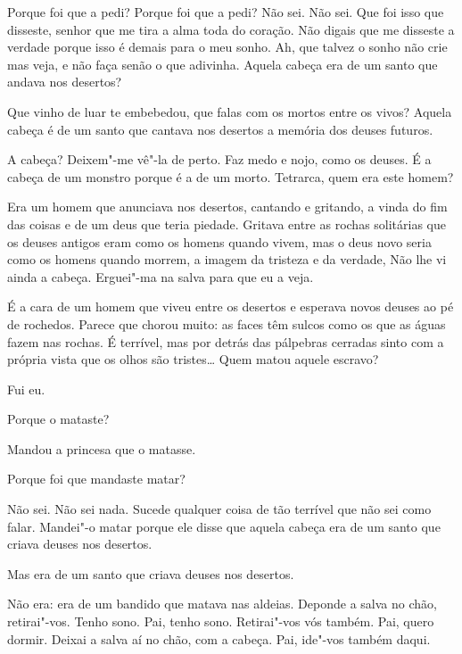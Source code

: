 Porque foi que a pedi? Porque foi que a pedi? Não sei. Não
sei. Que foi isso que disseste, senhor que me tira a alma toda do
coração. Não digais que me disseste a verdade porque isso é demais
para o meu sonho. Ah, que talvez o sonho não crie mas veja, e não
faça senão o que adivinha. Aquela cabeça era de um santo que andava
nos desertos?

 Que vinho de luar te embebedou, que falas com os mortos
entre os vivos? Aquela cabeça é de um santo que cantava nos desertos
a memória dos deuses futuros.

 A cabeça? Deixem"-me vê"-la de perto.  Faz medo e nojo, como os deuses. É a cabeça
de um monstro porque é a de um morto. Tetrarca, quem era este homem? 

 Era um homem que anunciava nos desertos, cantando e
gritando, a vinda do fim das coisas e de um deus que teria piedade.
Gritava entre as rochas solitárias que os deuses antigos eram como os
homens quando vivem, mas o deus novo seria como os homens quando
morrem, a imagem da tristeza e da verdade, Não lhe vi ainda a cabeça.
Erguei"-ma na salva para que eu a veja.


 É a cara de um homem que viveu entre os desertos e
esperava novos deuses ao pé de rochedos. Parece que chorou muito: as
faces têm sulcos como os que as águas fazem nas rochas. É terrível,
mas por detrás das pálpebras cerradas sinto com a própria vista que
os olhos são tristes\ldots{} Quem matou aquele escravo?

 Fui eu.

 Porque o mataste?

 Mandou a princesa que o matasse.

 Porque foi que mandaste matar?

 Não sei. Não sei nada. Sucede qualquer coisa de tão
terrível que não sei como falar. Mandei"-o matar porque ele disse que
aquela cabeça era de um santo que criava deuses nos desertos.

 Mas era de um santo que criava deuses nos desertos.

 Não era: era de um bandido que matava nas aldeias. Deponde
a salva no chão, retirai"-vos. Tenho sono. Pai, tenho sono.
 Retirai"-vos vós também. Pai, quero dormir.
Deixai a salva aí no chão, com a cabeça. Pai, ide"-vos também daqui. 

